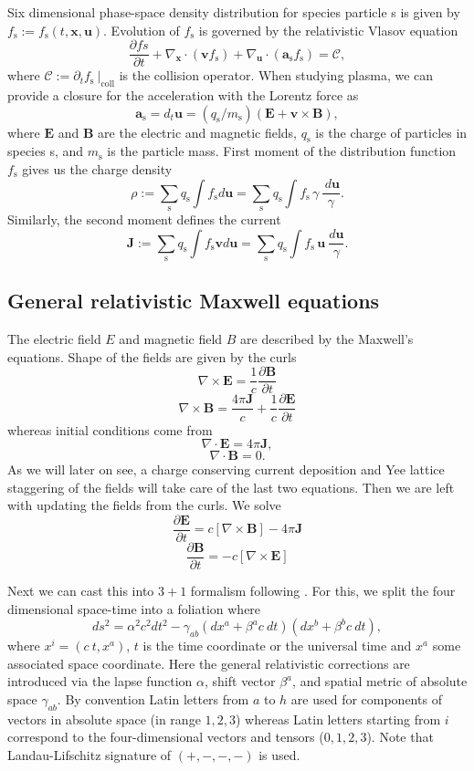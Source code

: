 \documentclass{aa}
\newcommand{\be}{\begin{equation}}
\newcommand{\ee}{\end{equation}}
\newcommand{\D}[2]{\ensuremath{\frac{\partial {#1} }{\partial {#2} }}}
\newcommand{\f}[1]{\ensuremath{f_{\mathrm{ {#1} }}}}
\renewcommand{\vec}[1]{\ensuremath{\boldsymbol{#1}}}
\begin{document}
Six dimensional phase-space density distribution for species particle s is given by $\f{s} := \f{s}(t, \vec{x}, \vec{u})$.
Evolution of $\f{s}$ is governed by the relativistic Vlasov equation
\be
\D{f{s}}{t} + \nabla_{\vec{x}} \cdot (\vec{v} \f{s}) + \nabla_{\vec{u}} \cdot (\vec{a}_{\mathrm{s}} \f{s} ) = \mathcal{C},
\ee
where $\mathcal{C} := \partial_t \f{s} ~|_{\mathrm{coll}}$ is the collision operator.
When studying plasma, we can provide a closure for the acceleration with the Lorentz force as 
\be
\vec{a}_{\mathrm{s}} = d_t \vec{u} = (q_{\mathrm{s}} / m_{\mathrm{s}} )(\vec{E} + \vec{v} \times \vec{B}),
\ee
where $\vec{E}$ and $\vec{B}$ are the electric and magnetic fields, $q_{\mathrm{s}}$ is the charge of particles in species s, and $m_{\mathrm{s}}$ is the particle mass.
First moment of the distribution function $\f{s}$ gives us the charge density
\be
\rho := \sum_{\mathrm{s}} q_{\mathrm{s}} \int \f{s} d\vec{u} = \sum_{\mathrm{s}} q_{\mathrm{s}} \int \f{s} \, \gamma \, \frac{ ~d\vec{u}}{\gamma}.
\ee
Similarly, the second moment defines the current
\be
\vec{J} := \sum_{\mathrm{s}} q_{\mathrm{s}} \int \f{s} \vec{v} d\vec{u} = \sum_{\mathrm{s}} q_{\mathrm{s}} \int \f{s} \, \vec{u} ~\frac{ d\vec{u}}{\gamma}.
\ee



\subsection{General relativistic Maxwell equations}
The electric field $E$ and magnetic field $B$ are described by the Maxwell's equations.
Shape of the fields are given by the curls
\be
\nabla \times \vec{E} = \frac{1}{c} \frac{\partial \vec{B}} {\partial t}
\ee
\be
\nabla \times \vec{B} = \frac{4 \pi \vec{J}}{c} + \frac{1}{c} \frac{\partial \vec{E}} {\partial t}
\ee
whereas initial conditions come from
\be
\nabla \cdot \vec{E} = 4\pi\vec{J},
\ee
\be
\nabla \cdot \vec{B} = 0.
\ee
As we will later on see, a charge conserving current deposition and Yee lattice staggering of the fields will take care of the last two equations.
Then we are left with updating the fields from the curls.
We solve
\be
\frac{\partial \vec{E}}{\partial t} = c [ \nabla \times \vec{B}] - 4\pi \vec{J}
\ee
\be
\frac{\partial \vec{B}}{\partial t} = -c[ \nabla \times \vec{E}]
\ee

Next we can cast this into $3+1$ formalism following \citealt{P15}.
For this, we split the four dimensional space-time into a foliation where 
\be
ds^2 = \alpha^2 c^2 dt^2 - \gamma_{ab}(dx^a + \beta^a c~dt)(dx^b + \beta^b c~dt),
\ee
where $x^i = (c~t, x^a)$, $t$ is the time coordinate or the universal time and $x^a$ some associated space coordinate.
Here the general relativistic corrections are introduced via the lapse function $\alpha$, shift vector $\beta^a$, and spatial metric of absolute space $\gamma_{ab}$.
By convention Latin letters from $a$ to $h$ are used for components of vectors in absolute space (in range ${1,2,3}$) whereas Latin letters starting from $i$ correspond to the four-dimensional vectors and tensors (${0,1,2,3}$).
Note that Landau-Lifschitz signature of $(+,-,-,-)$ is used.
\end{document}
